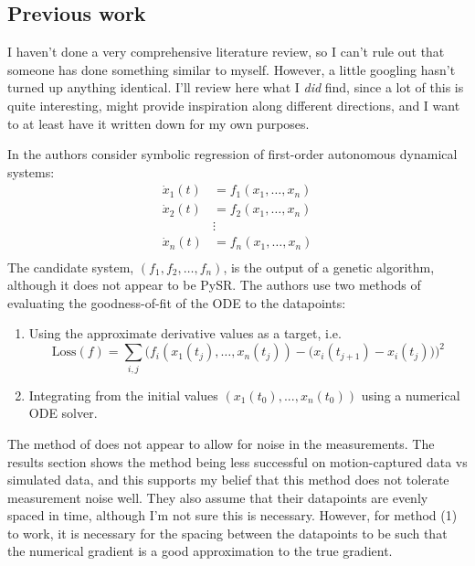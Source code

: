 \documentclass{article}
\begin{document}
\subsection{Previous work}
\label{sec:prev_work}

I haven't done a very comprehensive literature review, so I can't rule out that someone has done something similar to myself.
However, a little googling hasn't turned up anything identical.
I'll review here what I \emph{did} find, since a lot of this is quite interesting, might provide inspiration along different directions, and I want to at least have it written down for my own purposes.

In \cite{kronberger2019identification} the authors consider symbolic regression of first-order autonomous dynamical systems:
\begin{align}
\dot{x}_1(t) &= f_1\left(x_1, \dots, x_n\right) \nonumber \\
\dot{x}_2(t) &= f_2\left(x_1, \dots, x_n\right) \nonumber \\
 & \vdots \nonumber \\
\dot{x}_n(t) &= f_n\left(x_1, \dots, x_n\right) \nonumber \\
\end{align}
The candidate system, $\left( f_1, f_2, \dots, f_n\right)$, is the output of a genetic algorithm, although it does not appear to be PySR.
The authors use two methods of evaluating the goodness-of-fit of the ODE to the datapoints:
\begin{enumerate}
\item Using the approximate derivative values as a target, i.e.
$$
\mathrm{Loss}(f) = \sum_{i, j} \bigg(f_i\left( x_1(t_j), \dots, x_n(t_j) \right) - \big(x_i(t_{j+1}) - x_i(t_j)\big) \bigg)^2
$$
\item Integrating from the initial values $(x_1(t_0), ..., x_n(t_0))$ using a numerical ODE solver.
\end{enumerate}
The method of \cite{kronberger2019identification} does not appear to allow for noise in the measurements.
The results section shows the method being less successful on motion-captured data vs simulated data, and this supports my belief that this method does not tolerate measurement noise well.
They also assume that their datapoints are evenly spaced in time, although I'm not sure this is necessary. However, for method (1) to work, it is necessary for the spacing between the datapoints to be such that the numerical gradient is a good approximation to the true gradient.
\end{document}
